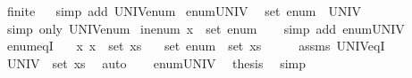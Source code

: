 \begin{isabellebody}
\isanewline
{}\isanewline
\isanewline
{}\isamarkupfalse%
\ finite%
\isadelimproof
\ %
\endisadelimproof
%
\isatagproof
{}\isamarkupfalse%
\isanewline
{}\isamarkupfalse%
\ {\isacharparenleft}{\kern0pt}simp\ add{\isacharcolon}{\kern0pt}\ UNIV{\isacharunderscore}{\kern0pt}enum{\isacharparenright}{\kern0pt}%
\endisatagproof
{\isafoldproof}%
%
\isadelimproof
%
\endisadelimproof
\isanewline
\isanewline
{}\isamarkupfalse%
\ enum{\isacharunderscore}{\kern0pt}UNIV{\isacharcolon}{\kern0pt}\isanewline
\ \ {\isachardoublequoteopen}set\ enum\ {\isacharequal}{\kern0pt}\ UNIV{\isachardoublequoteclose}\isanewline
%
\isadelimproof
\ \ %
\endisadelimproof
%
\isatagproof
{}\isamarkupfalse%
\ {\isacharparenleft}{\kern0pt}simp\ only{\isacharcolon}{\kern0pt}\ UNIV{\isacharunderscore}{\kern0pt}enum{\isacharparenright}{\kern0pt}%
\endisatagproof
{\isafoldproof}%
%
\isadelimproof
\isanewline
%
\endisadelimproof
\isanewline
{}\isamarkupfalse%
\ in{\isacharunderscore}{\kern0pt}enum{\isacharcolon}{\kern0pt}\ {\isachardoublequoteopen}x\ {\isasymin}\ set\ enum{\isachardoublequoteclose}\isanewline
%
\isadelimproof
\ \ %
\endisadelimproof
%
\isatagproof
{}\isamarkupfalse%
\ {\isacharparenleft}{\kern0pt}simp\ add{\isacharcolon}{\kern0pt}\ enum{\isacharunderscore}{\kern0pt}UNIV{\isacharparenright}{\kern0pt}%
\endisatagproof
{\isafoldproof}%
%
\isadelimproof
\isanewline
%
\endisadelimproof
\isanewline
{}\isamarkupfalse%
\ enum{\isacharunderscore}{\kern0pt}eq{\isacharunderscore}{\kern0pt}I{\isacharcolon}{\kern0pt}\isanewline
\ \ \ {\isachardoublequoteopen}{\isasymAnd}x{\isachardot}{\kern0pt}\ x\ {\isasymin}\ set\ xs{\isachardoublequoteclose}\isanewline
\ \ \ {\isachardoublequoteopen}set\ enum\ {\isacharequal}{\kern0pt}\ set\ xs{\isachardoublequoteclose}\isanewline
%
\isadelimproof
%
\endisadelimproof
%
\isatagproof
{}\isamarkupfalse%
\ {\isacharminus}{\kern0pt}\isanewline
\ \ \isamarkupfalse%
\ assms\ UNIV{\isacharunderscore}{\kern0pt}eq{\isacharunderscore}{\kern0pt}I\ \isamarkupfalse%
\ {\isachardoublequoteopen}UNIV\ {\isacharequal}{\kern0pt}\ set\ xs{\isachardoublequoteclose}\ \isamarkupfalse%
\ auto\isanewline
\ \ \isamarkupfalse%
\ enum{\isacharunderscore}{\kern0pt}UNIV\ \isamarkupfalse%
\ {\isacharquery}{\kern0pt}thesis\ \isamarkupfalse%
\ simp\isanewline

\end{isabellebody}
